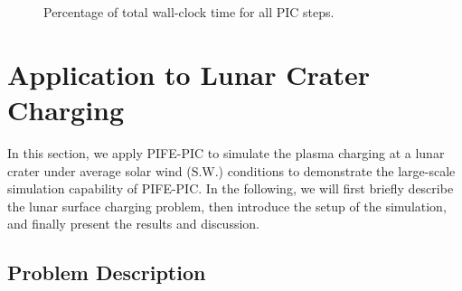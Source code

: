 \documentclass{siamart171218}
\begin{document}
%
\begin{figure}[ht]
\centering
\begin{subfigmatrix}{2}%
\end{subfigmatrix}
\caption{%
Percentage of total wall-clock time
for all PIC steps.
}
\label{fig:scaling:percentage}
\end{figure}


\section{Application to Lunar Crater Charging}
\label{sec:lunar}


In this section, we apply PIFE-PIC to simulate the plasma charging
at a lunar crater under average solar wind (S.W.) conditions
to demonstrate the large-scale simulation capability of PIFE-PIC.
In the following, we will first briefly describe the lunar surface charging problem,
then introduce the setup of the simulation,
and finally present the results and discussion.


\subsection{Problem Description}
\end{document}
